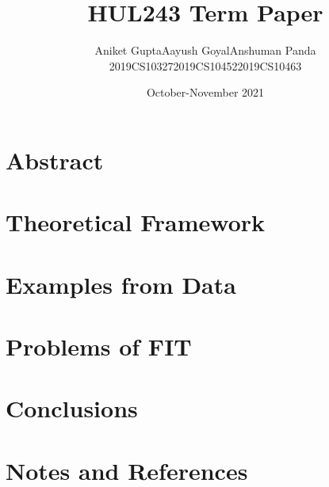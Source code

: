 \documentclass{article}
\title{HUL243 Term Paper}
\author{\hspace{0.55cm}Aniket Gupta\hspace{2cm}Aayush Goyal\hspace{2cm}Anshuman Panda\\2019CS10327\hspace{2.2cm}2019CS10452\hspace{2.4cm}2019CS10463}
\date{October-November 2021}
\begin{document}
\maketitle

\section{Abstract}

\section{Theoretical Framework}

\section{Examples from Data}

\section{Problems of FIT}

\section{Conclusions}

\section{Notes and References}
\end{document}
